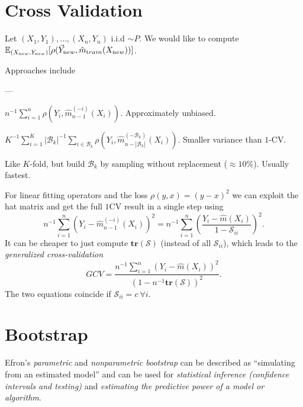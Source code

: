 \section{Cross Validation}\label{sec:cross-validation}
Let $(X_{1}, Y_{1}), \dots, (X_{n}, Y_{n})$ i.i.d $\sim P$.
We would like to compute $\mathbb{E}_{(X_{\textrm new}, Y_{\textrm new})}[\rho(\vec{Y}_{\textrm new}, \hat{m}_{\textrm train} (X_{\textrm new}))]$.
\begin{sectionbox}\nospacing{}
  Approaches include
  \begin{description}[topsep=0pt,itemsep=-1ex,partopsep=1ex,parsep=1ex]
    \item[Validation set:] ---
    \item[Leave-one-out CV:] $n^{-1}\sum_{i=1}^{n}\rho\left(Y_{i}, \hat{m}_{n-1}^{(-i)}(X_{i})\right)$. Approximately unbiased.
    \item[$K$-fold CV:] $K^{-1}\sum_{i=1}^{K}|\mathcal{B}_{k}|^{-1}\sum_{i\in\mathcal{B}_{k}}\rho\left(Y_{i}, \hat{m}_{n-|\mathcal{B}_{k}|}^{(-\mathcal{B}_{k})}(X_{i})\right)$. Smaller variance than $1$-CV.
    \item[Random division:] Like $K$-fold, but build $\mathcal{B}_{k}$ by sampling without replacement ($\approx 10\%$). Usually fastest.
  \end{description}
\end{sectionbox}
\begin{sectionbox}\nospacing{}
  For linear fitting operators and the loss $\rho(y, x) = (y-x)^{2}$ we can exploit the hat matrix and get the full $1$CV result in a single step using
  \[
    n^{-1}\sum_{i=1}^{n}\left(Y_{i}-\hat{m}_{n-1}^{(-i)}(X_{i})\right)^{2} = n^{-1}\sum_{i=1}^{n}\left(\frac{Y_{i}-\hat{m}(X_{i})}{1-\mathcal{S}_{ii}}\right)^{2}.
  \]
  It can be cheaper to just compute $\mathbf{tr}(\mathcal{S})$ (instead of all $\mathcal{S}_{ii}$), which leads to the \emph{generalized cross-validation}
  \[
    GCV = \frac{n^{-1}\sum_{i=1}^{n}(Y_{i}-\hat{m}(X_{i}))^{2}}{(1-n^{-1}\mathbf{tr}(\mathcal{S}))^{2}}.
  \]
  The two equations coincide if $\mathcal{S}_{ii}=c\ \forall i$.
\end{sectionbox}

\section{Bootstrap}\label{sec:bootstrap}
Efron's \emph{parametric} and \emph{nonparametric bootstrap} can be described as ``simulating from an estimated model'' and can be used for \emph{statistical inference (confidence intervals and testing)} and \emph{estimating the predictive power of a model or algorithm}.

